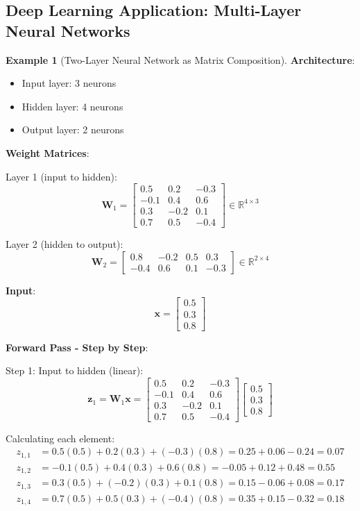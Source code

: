 \documentclass[12pt,a4paper]{article}
\theoremstyle{definition}
\newtheorem{example}{Example}[section]
\begin{document}
\subsection{Deep Learning Application: Multi-Layer Neural Networks}

\begin{example}[Two-Layer Neural Network as Matrix Composition]
\textbf{Architecture}:
\begin{itemize}
\item Input layer: 3 neurons
\item Hidden layer: 4 neurons
\item Output layer: 2 neurons
\end{itemize}

\textbf{Weight Matrices}:

Layer 1 (input to hidden):
\[
\mathbf{W}_1 = \begin{bmatrix}
0.5 & 0.2 & -0.3 \\
-0.1 & 0.4 & 0.6 \\
0.3 & -0.2 & 0.1 \\
0.7 & 0.5 & -0.4
\end{bmatrix} \in \mathbb{R}^{4 \times 3}
\]

Layer 2 (hidden to output):
\[
\mathbf{W}_2 = \begin{bmatrix}
0.8 & -0.2 & 0.5 & 0.3 \\
-0.4 & 0.6 & 0.1 & -0.3
\end{bmatrix} \in \mathbb{R}^{2 \times 4}
\]

\textbf{Input}:
\[
\mathbf{x} = \begin{bmatrix}
0.5 \\ 0.3 \\ 0.8
\end{bmatrix}
\]

\textbf{Forward Pass - Step by Step}:

Step 1: Input to hidden (linear):
\[
\mathbf{z}_1 = \mathbf{W}_1\mathbf{x} = \begin{bmatrix}
0.5 & 0.2 & -0.3 \\
-0.1 & 0.4 & 0.6 \\
0.3 & -0.2 & 0.1 \\
0.7 & 0.5 & -0.4
\end{bmatrix}
\begin{bmatrix}
0.5 \\ 0.3 \\ 0.8
\end{bmatrix}
\]

Calculating each element:
\begin{align*}
z_{1,1} &= 0.5(0.5) + 0.2(0.3) + (-0.3)(0.8) = 0.25 + 0.06 - 0.24 = 0.07 \\
z_{1,2} &= -0.1(0.5) + 0.4(0.3) + 0.6(0.8) = -0.05 + 0.12 + 0.48 = 0.55 \\
z_{1,3} &= 0.3(0.5) + (-0.2)(0.3) + 0.1(0.8) = 0.15 - 0.06 + 0.08 = 0.17 \\
z_{1,4} &= 0.7(0.5) + 0.5(0.3) + (-0.4)(0.8) = 0.35 + 0.15 - 0.32 = 0.18
\end{align*}


\end{example}
\end{document}
